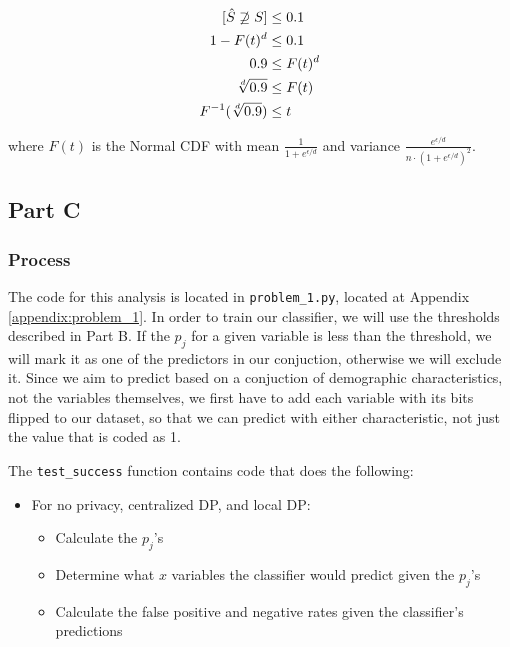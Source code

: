 \documentclass[12pt]{article}
\let\Pr\relax
\DeclareMathOperator*{\Pr}{\mathbb{P}}
\def\cl{\lstinline}
\begin{document}
\begin{align*}
\Pr[\hat{S} \not \supseteq S] &\leq 0.1 \\
1 - F(t)^d &\leq 0.1 \\
0.9 &\leq F(t)^d \\
\sqrt[d]{0.9} &\leq F(t) \\
F^{-1}(\sqrt[d]{0.9}) &\leq t \\
\end{align*}

where $F(t)$ is the Normal CDF with mean $\frac{1}{1 + e^{\epsilon/d}}$ and variance $\frac{e^{\epsilon/d}}{n \cdot (1 + e^{\epsilon/d})^2}$.

\subsection{Part C}

\subsubsection{Process}

\noindent

The code for this analysis is located in \cl{problem_1.py}, located at Appendix \ref{appendix:problem_1}. In order to train our classifier, we will use the thresholds described in Part B. If the $p_j$ for a given variable is less than the threshold, we will mark it as one of the predictors in our conjuction, otherwise we will exclude it. Since we aim to predict based on a conjuction of demographic characteristics, not the variables themselves, we first have to add each variable with its bits flipped to our dataset, so that we can predict with either characteristic, not just the value that is coded as 1.

\bigskip

The \cl{test_success} function contains code that does the following:
\begin{itemize}
  \item For no privacy, centralized DP, and local DP:
  \begin{itemize}
    \item Calculate the $p_j$'s
    \item Determine what $x$ variables the classifier would predict given the $p_j$'s
    \item Calculate the false positive and negative rates given the classifier's predictions
  \end{itemize}
\end{itemize}
\end{document}
